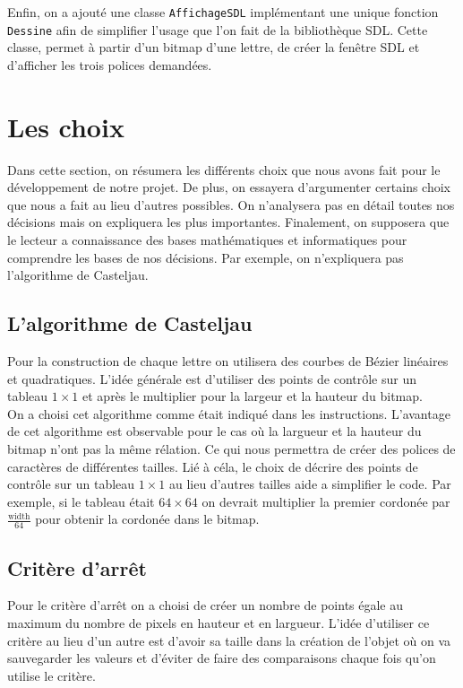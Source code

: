 \documentclass[11pt,a4paper]{article}
\begin{document}
	Enfin, on a ajouté une classe \texttt{AffichageSDL} implémentant une unique fonction \texttt{Dessine} afin de simplifier l'usage que l'on fait de la bibliothèque SDL. Cette classe, permet à partir d'un bitmap d'une lettre, de créer la fenêtre SDL et d'afficher les trois polices demandées.
	
	
	\newpage
	\section{Les choix}
	Dans cette section, on résumera les différents choix que nous avons fait pour le développement de notre projet. De plus, on essayera d'argumenter certains choix que nous a fait au lieu d'autres possibles. On n'analysera pas en détail toutes nos décisions mais on expliquera les plus importantes. Finalement, on supposera que le lecteur a connaissance des bases mathématiques et informatiques pour comprendre les bases de nos décisions. Par exemple, on n'expliquera pas l'algorithme de Casteljau.
	
	\subsection{L'algorithme de Casteljau}
	Pour la construction de chaque lettre on utilisera des courbes de Bézier linéaires et quadratiques. L'idée générale est d'utiliser des points de contrôle sur un tableau $1 \times 1$ et après le multiplier pour la largeur et la hauteur du bitmap.\\
	
	On a choisi cet algorithme comme était indiqué dans les instructions. L'avantage de cet algorithme est observable pour le cas où la largueur et la hauteur du bitmap n'ont pas la même rélation. Ce qui nous permettra de créer des polices de caractères de différentes tailles. Lié à céla, le choix de décrire des points de contrôle sur un tableau $1 \times 1$ au lieu d'autres tailles aide a simplifier le code. Par exemple, si le tableau était $64 \times 64$ on devrait multiplier la premier cordonée par $\frac{\text{width}}{64}$ pour obtenir la cordonée dans le bitmap.
	
	\subsection{Critère d'arrêt}
	Pour le critère d'arrêt on a choisi de créer un nombre de points égale au maximum du nombre de pixels en hauteur et en largueur. L'idée d'utiliser ce critère au lieu d'un autre est d'avoir  sa taille dans la création de l'objet où on va sauvegarder les valeurs et d'éviter de faire des comparaisons chaque fois qu'on utilise le critère.
	
\end{document}
